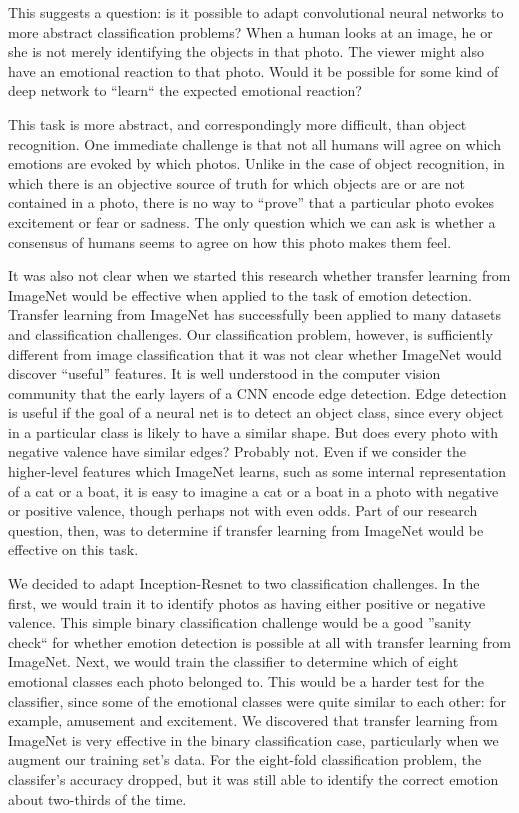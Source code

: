 \documentclass[10pt,twocolumn,letterpaper]{article}
\begin{document}
This suggests a question: is it possible to adapt convolutional neural networks to more abstract classification problems? When a human looks at an image, he or she is not merely identifying the objects in that photo. The viewer might also have an emotional reaction to that photo. Would it be possible for some kind of deep network to ``learn`` the expected emotional reaction?

This task is more abstract, and correspondingly more difficult, than object recognition. One immediate challenge is that not all humans will agree on which emotions are evoked by which photos. Unlike in the case of object recognition, in which there is an objective source of truth for which objects are or are not contained in a photo, there is no way to ``prove'' that a particular photo evokes excitement or fear or sadness. The only question which we can ask is whether a consensus of humans seems to agree on how this photo makes them feel.

It was also not clear when we started this research whether transfer learning from ImageNet would be effective when applied to the task of emotion detection. Transfer learning from ImageNet has successfully been applied to many datasets and classification challenges\cite{transferlearning}. Our classification problem, however, is sufficiently different from image classification that it was not clear whether ImageNet would discover ``useful'' features. It is well understood in the computer vision community that the early layers of a CNN encode edge detection. Edge detection is useful if the goal of a neural net is to detect an object class, since every object in a particular class is likely to have a similar shape. But does every photo with negative valence have similar edges? Probably not. Even if we consider the higher-level features which ImageNet learns, such as some internal representation of a cat or a boat, it is easy to imagine a cat or a boat in a photo with negative or positive valence, though perhaps not with even odds. Part of our research question, then, was to determine if transfer learning from ImageNet would be effective on this task.

We decided to adapt Inception-Resnet to two classification challenges. In the first, we would train it to identify photos as having either positive or negative valence. This simple binary classification challenge would be a good ''sanity check`` for whether emotion detection is possible at all with transfer learning from ImageNet. Next, we would train the classifier to determine which of eight emotional classes each photo belonged to. This would be a harder test for the classifier, since some of the emotional classes were quite similar to each other: for example, amusement and excitement. We discovered that transfer learning from ImageNet is very effective in the binary classification case, particularly when we augment our training set's data. For the eight-fold classification problem, the classifer's accuracy dropped, but it was still able to identify the correct emotion about two-thirds of the time.
\end{document}
